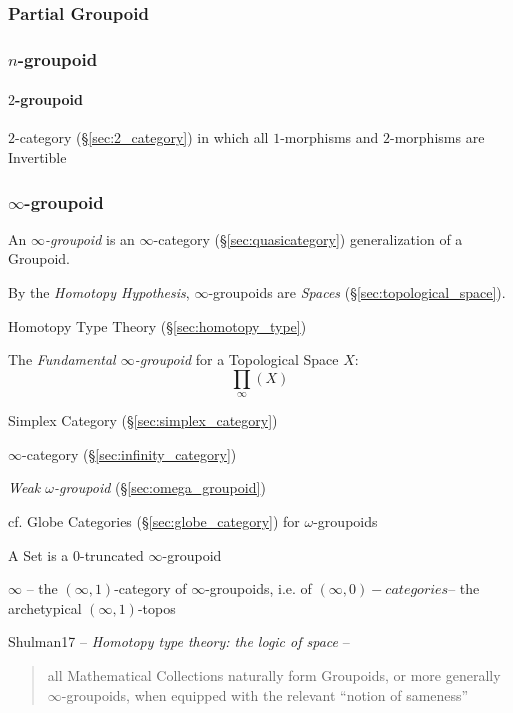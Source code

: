 \subsubsection{Partial Groupoid}\label{sec:partial_groupoid}

\subsubsection{$n$-groupoid}\label{sec:n_groupoid}

\paragraph{$2$-groupoid}\label{sec:2_groupoid}\hfill

$2$-category (\S\ref{sec:2_category}) in which all $1$-morphisms and
$2$-morphisms are Invertible



\subsubsection{$\infty$-groupoid}\label{sec:infinity_groupoid}

An \emph{$\infty$-groupoid} is an $\infty$-category
(\S\ref{sec:quasicategory}) generalization of a Groupoid.

By the \emph{Homotopy Hypothesis}, $\infty$-groupoids are \emph{Spaces}
(\S\ref{sec:topological_space}).

Homotopy Type Theory (\S\ref{sec:homotopy_type})

The \emph{Fundamental $\infty$-groupoid} for a Topological Space $X$:
\[
  \prod_\infty(X)
\]

Simplex Category (\S\ref{sec:simplex_category})

\fist $\infty$-category (\S\ref{sec:infinity_category})

\emph{Weak $\omega$-groupoid} (\S\ref{sec:omega_groupoid})

\fist cf. Globe Categories (\S\ref{sec:globe_category}) for
$\omega$-groupoids

A Set is a $0$-truncated $\infty$-groupoid %

$\infty$ -- the $(\infty,1)$-category of $\infty$-groupoids,
i.e. of $(\infty,0)-categories$-- the archetypical
$(\infty,1)$-topos %

Shulman17 -- \emph{Homotopy type theory: the logic of space} --
\begin{quote}
all Mathematical Collections naturally form Groupoids, or more
generally $\infty$-groupoids, when equipped with the relevant ``notion
of sameness''
\end{quote}



